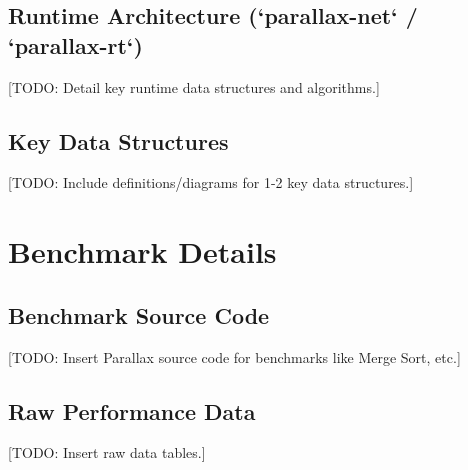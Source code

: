 \subsection{Runtime Architecture (`parallax-net` / `parallax-rt`)} %
[TODO: Detail key runtime data structures and algorithms.]

\subsection{Key Data Structures} %
[TODO: Include definitions/diagrams for 1-2 key data structures.]

\section{Benchmark Details} %

\subsection{Benchmark Source Code} %
[TODO: Insert Parallax source code for benchmarks like Merge Sort, etc.]

\subsection{Raw Performance Data} %
[TODO: Insert raw data tables.]

